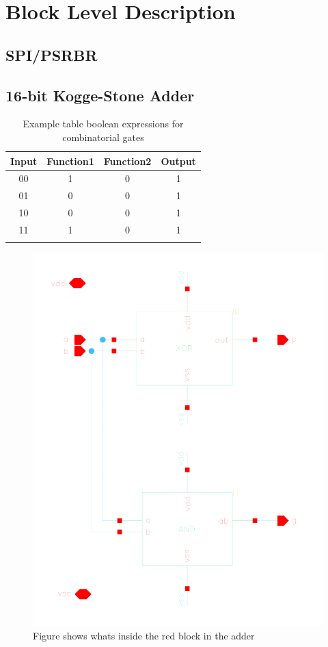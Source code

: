 \section{Block Level Description}

\subsection{SPI/PSRBR}

\subsection{16-bit Kogge-Stone Adder}
\begin{table}[H]
\caption{Example table boolean expressions for combinatorial gates}
\centering
\begin{tabular}{cccc}
\toprule
Input & Function1 & Function2 & Output \\
\midrule
00 & 1 & 0& 1\\
01 & 0 & 0 & 1\\
10 & 0 & 0 & 1\\
11 & 1 & 0 & 1\\
\bottomrule
\label{tab:SPI}
\end{tabular}
\end{table}

\begin{figure}[H]
  \centering
  \captionsetup{justification=centering}
  \includegraphics[clip,width=1.0\textwidth]{../figures/red}
  \caption{Figure shows whats inside the red block in the adder} \label{fig:red}
\end{figure}

